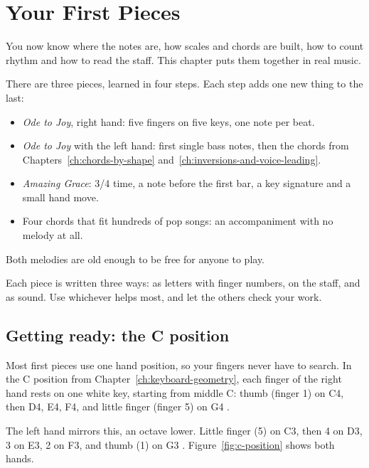\chapter{Your First Pieces}
\label{ch:first-pieces}
\chapterline

You now know where the notes are, how scales and chords are built, how to count rhythm and how to read the staff. This chapter puts them together in real music.

There are three pieces, learned in four steps. Each step adds one new thing to the last:
\begin{itemize}
  \item \emph{Ode to Joy}, right hand: five fingers on five keys, one note per beat.
  \item \emph{Ode to Joy} with the left hand: first single bass notes, then the chords from Chapters~\ref{ch:chords-by-shape} and~\ref{ch:inversions-and-voice-leading}.
  \item \emph{Amazing Grace}: 3/4 time, a note before the first bar, a key signature and a small hand move.
  \item Four chords that fit hundreds of pop songs: an accompaniment with no melody at all.
\end{itemize}
Both melodies are old enough to be free for anyone to play.

Each piece is written three ways: as letters with finger numbers, on the staff, and as sound. Use whichever helps most, and let the others check your work.

\section{Getting ready: the C position}

Most first pieces use one hand position, so your fingers never have to search. In the C position from Chapter~\ref{ch:keyboard-geometry}, each finger of the right hand rests on one white key, starting from middle C: thumb (finger 1) on C4, then D4, E4, F4, and little finger (finger 5) on G4 .

The left hand mirrors this, an octave lower. Little finger (5) on C3, then 4 on D3, 3 on E3, 2 on F3, and thumb (1) on G3 . Figure~\ref{fig:c-position} shows both hands.

